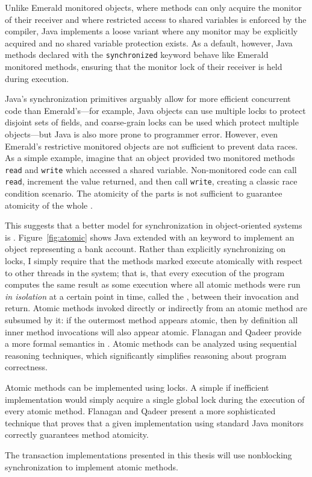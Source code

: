 Unlike Emerald monitored objects, where methods can only acquire the
monitor of their receiver and where restricted access to shared
variables is enforced by the compiler, Java implements a loose
variant where any monitor may be explicitly acquired and no shared
variable protection exists.  As a default, however, Java methods
declared with the {\tt synchronized} keyword behave like Emerald
monitored methods,
ensuring that the monitor lock of their receiver is held during execution.

Java's synchronization primitives arguably allow for more efficient
concurrent code than Emerald's---for example, Java objects can use
multiple locks to
protect disjoint sets of fields, and coarse-grain locks can be used
which protect multiple objects---but Java is also more prone to programmer
error.  However, even Emerald's restrictive
monitored objects are not sufficient to prevent data races.  As a
simple example, imagine that an object provided two monitored methods
{\tt read} and {\tt write} which accessed a shared variable.
Non-monitored code can call {\tt read}, increment the value returned,
and then call {\tt write}, creating a classic race condition scenario.
The atomicity of the parts is not sufficient to guarantee atomicity of
the whole \cite{FlanaganQa03}.

This suggests that a better model for synchronization in
object-oriented systems is .  Figure~\ref{fig:atomic}
shows Java extended with an \atomic keyword to implement an
object representing a bank account.  Rather than explicitly
synchronizing on locks, I simply require that the methods marked
\atomic execute atomically with respect to other threads in the
system; that is, that every execution of the program computes the same
result as some execution where all atomic methods were run \emph{in
  isolation} at a certain point in time, called the
, between their invocation and return.
Atomic methods invoked directly or indirectly from an atomic
method are subsumed by it: if the outermost method appears atomic,
then by definition all inner method invocations will also appear atomic.
Flanagan and Qadeer provide a more formal semantics in \cite{FlanaganQa03}.
Atomic methods can be analyzed using sequential reasoning techniques, which
significantly simplifies reasoning about program correctness.

Atomic methods can be implemented using locks.  A simple if inefficient
implementation would simply acquire a single global lock during
the execution of every atomic method.  Flanagan and Qadeer
\cite{FlanaganQa03} present a more sophisticated technique that proves that
a given implementation using standard Java monitors correctly
guarantees method atomicity.

The transaction implementations presented in this thesis will use
nonblocking synchronization to implement atomic methods.


